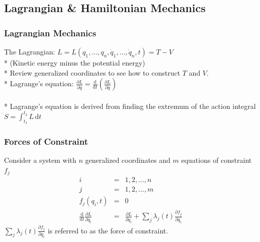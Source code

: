 \subsection{Lagrangian \& Hamiltonian Mechanics}

\subsubsection{Lagrangian Mechanics}
The Lagrangian: \(L=L(q_1,\ldots,q_n,\dot{q}_1,\ldots,\dot{q}_n,t)=T-V\)\\*
(Kinetic energy minus the potential energy)\\*
Review generalized coordinates to see how to construct \(T\) and \(V\).\\*
Lagrange's equation: \(\displaystyle\frac{\partial L}{\partial q}=\frac{\mathrm{d}}{\mathrm{d}t}\left(\frac{\partial L}{\partial \dot{q}}\right)\)\\\\*
Lagrange's equation is derived from finding the extremum of the action integral \(\displaystyle S=\int_{t_1}^{t_2}L\,\mathrm{d}t\)

\subsubsection{Forces of Constraint}
Consider a system with \(n\) generalized coordinates and \(m\) equations of constraint \(f_j\)
\begin{eqnarray}
i&=&1,2,\ldots,n \nonumber \\
j&=&1,2,\ldots,m \nonumber \\
f_j(q_i,t) &=& 0 \nonumber \\
\frac{\mathrm{d}}{\mathrm{d}t}\frac{\partial L}{\partial \dot{q}_i}&=&\frac{\partial L}{\partial q_i}+\sum_j\lambda_j(t)\frac{\partial f_j}{\partial q_i} \nonumber
\end{eqnarray}
\(\sum_j\lambda_j(t)\frac{\partial f_j}{\partial q_i}\) is referred to as the force of constraint.

